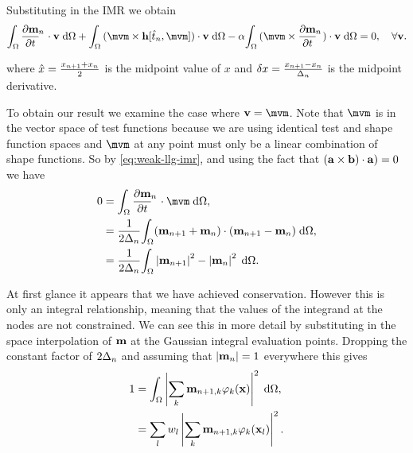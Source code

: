 \newcommand{\pdsub}[3]{\mathrlap{\pd{#1\mathrlap{_{#2}}}{#3}}\phantom{\pd{#1_{#2}}{#3}}}
\newcommand{\dtop}{\delta}
\newcommand{\dmdtm}{\pdsub{\mv}{n}{t}}
\newcommand{\dmdtml}{\pdsub{\mv}{n,l}{t}}
\newcommand{\dmdtmj}{\pdsub{\mv}{n,j}{t}}


Substituting in the IMR we obtain
\begin{equation}
  \label{eq:weak-llg-imr}
  \ipg{\dmdtm}{\testv} + \ipg{(\mvm \times \hv[\tm, \mvm])}{\testv} - \dampc \ipg{(\mvm \times \dmdtm)}{\testv} = 0, \quad \forall \testv .
\end{equation}

where $\hat{x} = \frac{x_{n+1} + x_{n}}{2}$ is the midpoint value of $x$ and $\dtop x = \frac{x_{n+1} - x_n}{\dtn}$ is the midpoint derivative.

To obtain our result we examine the case where $\testv = \mvm$.
Note that $\mvm$ is in the vector space of test functions because we are using identical test and shape function spaces and $\mvm$ at any point must only be a linear combination of shape functions.
So by \eqref{eq:weak-llg-imr}, and using the fact that $({\mathbf{a}} \times {\mathbf{b}}) \cdot {\mathbf{a}}) = 0$ we have
\begin{equation}
\label{eq:23}
  \begin{aligned}
    0 &= \ipg{\dmdtm}{\mvm}, \\
    &= \frac{1}{2\dtn} \intd{(\mv_{n+1} + \mv_{n}) \cdot (\mv_{n+1} - \mv_n)}, \\
    &= \frac{1}{2\dtn} \intd{\abs{\mv_{n+1}}^2 - \abs{\mv_{n}}^2}.
  \end{aligned}
\end{equation}

At first glance it appears that we have achieved conservation. However this is only an integral relationship, meaning that the values of the integrand at the nodes are not constrained.
We can see this in more detail by substituting in the space interpolation of $\mathbf{m}$ at the Gaussian integral evaluation points.
Dropping the constant factor of $2\Delta_{n}$ and assuming that $\left|{\mathbf{m}_n} \right| = 1$ everywhere this gives
\begin{equation}
  \begin{aligned} 
    1 &= {\int_{\Omega} \left|{\sum_k \mathbf{m}_{n+1, k} \varphi_k(\mathbf{x})} \right|^2 {\; \text{d}} {\Omega}}, \\
    &= \sum_l w_l \left|{\sum_k \mathbf{m}_{n+1, k} \varphi_k(\mathbf{x}_l)} \right|^2.
  \end{aligned} 
\end{equation}

